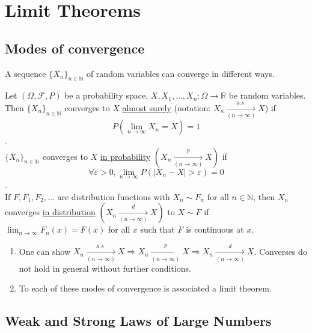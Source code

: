 \documentclass{article}
\newcommand{\R}{\mathbb{R}}
\newcommand{\N}{\mathbb{N}}
\begin{document}
			\newpage
			\section{Limit Theorems}
			\subsection{Modes of convergence}
			
			A sequence $\{X_n\}_{n\in\N}$ of random variables can converge in different ways.
			
			\begin{mydef}{}{}
				Let $(\Omega, \mathcal{F}, P)$ be a probability space, $X, X_1, \dots, X_n : \Omega\to\R$ be random variables. Then $\{X_n\}_{n\in\N}$ converges to $X$ \ul{almost surely} (notation: $X_n\underset{(n\to\infty)}{\overset{a.s.}{\to}}X$) if $$P(\lim_{n\to\infty}X_n=X)=1$$.\\
				
				$\{X_n\}_{n\in\N}$ converges to $X$ \ul{in probability} $(X_n\underset{(n\to\infty)}{\overset{p}{\to}}X)$ if $$\forall\varepsilon>0, \lim_{n\to\infty}P(|X_n-X|>\varepsilon)=0$$.\\
				
				If $F, F_1, F_2, \dots$ are distribution functions with $X_n\sim F_n$ for all $n\in\N$, then $X_n$ converges \ul{in distribution} $(X_n\underset{(n\to\infty)}{\overset{d}{\to}}X)$ to $X\sim F$ if $\lim_{n\to\infty}F_n(x)=F(x)$ for all $x$ such that $F$ is continuous at $x$.
			\end{mydef}
			
			\begin{myrem}{}{}
				\begin{enumerate}
					\item One can show $X_n\underset{(n\to\infty)}{\overset{a.s.}{\to}}X\Rightarrow X_n\underset{(n\to\infty)}{\overset{p}{\to}}X\Rightarrow X_n\underset{(n\to\infty)}{\overset{d}{\to}}X$. Converses do not hold in general without further conditions.
					
					\item To each of these modes of convergence is associated a limit theorem.
				\end{enumerate}
			\end{myrem}
			
			\subsection{Weak and Strong Laws of Large Numbers}
			
\end{document}
